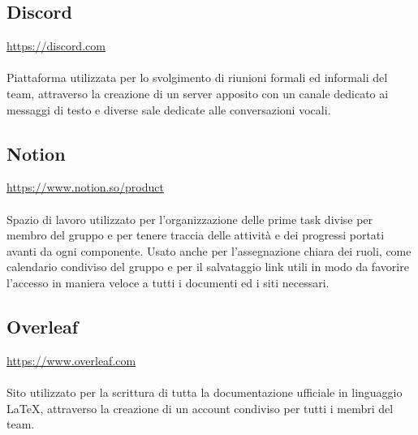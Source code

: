\documentclass[10pt, a4paper]{article}
\begin{document}
\subsection{Discord}
\href{https://discord.com}{https://discord.com}\\\\
Piattaforma utilizzata per lo svolgimento di riunioni formali ed informali del team, attraverso la creazione di un server apposito con un canale dedicato ai messaggi di testo e diverse sale dedicate alle conversazioni vocali.

\subsection{Notion}
\href{https://www.notion.so/product}{https://www.notion.so/product}\\\\
Spazio di lavoro utilizzato per l’organizzazione delle prime task divise per membro del gruppo e per tenere traccia delle attività e dei progressi portati avanti da ogni componente. Usato anche per l’assegnazione chiara dei ruoli, come calendario condiviso del gruppo e per il salvataggio link utili in modo da favorire l’accesso in maniera veloce a tutti i documenti ed i siti necessari.

\subsection{Overleaf}
\href{https://www.overleaf.com}{https://www.overleaf.com}\\\\
Sito utilizzato per la scrittura di tutta la documentazione ufficiale in linguaggio LaTeX, attraverso la creazione di un account condiviso per tutti i membri del team.
\end{document}

